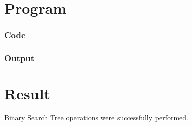 \section{Program}

\subsubsection{\underline{Code}}



\subsubsection{\underline{Output}}



\vfill

\section{Result}
{\Large\color{white}
Binary Search Tree operations were successfully performed.
\color{black}}

\clearpage